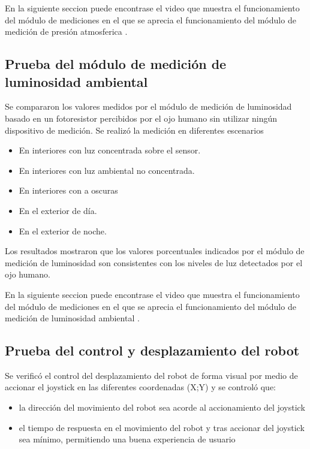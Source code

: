 En la siguiente seccion puede encontrase el video que muestra el funcionamiento del módulo de mediciones en el que se aprecia el funcionamiento del módulo de medición de presión atmosferica \cite{DemoMediciones}.

\subsection{Prueba del módulo de medición de luminosidad ambiental}

Se compararon los valores medidos por el módulo de medición de luminosidad basado en un fotoresistor percibidos por el ojo humano sin utilizar ningún dispositivo de medición. Se realizó la medición en diferentes escenarios

\begin{itemize}
	\item En interiores con luz concentrada sobre el sensor.
	\item En interiores con luz ambiental no concentrada.
	\item En interiores con a oscuras
	\item En el exterior de día.
	\item En el exterior de noche.
\end{itemize}

Los resultados mostraron que los valores porcentuales indicados por el módulo de medición de luminosidad son consistentes con los niveles de luz detectados por el ojo humano. 

En la siguiente seccion puede encontrase el video que muestra el funcionamiento del módulo de mediciones en el que se aprecia el funcionamiento del módulo de medición de luminosidad ambiental \cite{DemoMediciones}.

\subsection{Prueba del control y desplazamiento del robot}

Se verificó el control del desplazamiento del robot de forma visual por medio de accionar el joystick en las diferentes coordenadas (X;Y) y se controló que:

\begin{itemize}
	\item la dirección del movimiento del robot sea acorde al accionamiento del joystick
	\item el tiempo de respuesta en el movimiento del robot y tras accionar del joystick sea mínimo, permitiendo una buena experiencia de usuario
\end{itemize}

